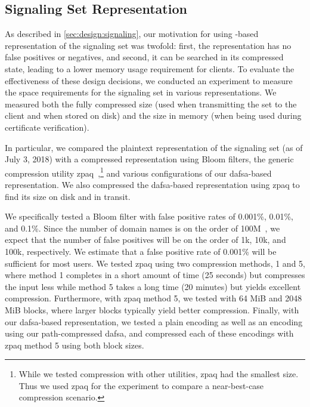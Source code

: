 \subsection{Signaling Set Representation}
\label{sec:evaluation:implementation}

As described in \autoref{sec:design:signaling}, our motivation for using
-based representation of the signaling set was twofold: first, the
representation has no false positives or negatives, and second, it can be
searched in its compressed state, leading to a lower memory usage requirement
for clients. To evaluate the effectiveness of these design decisions, we
conducted an experiment to measure the space requirements for the signaling set
in various representations. We measured both the fully compressed size (used
when transmitting the set to the client and when stored on disk) and the size in
memory (when being used during certificate verification).

In particular, we compared the plaintext representation of the signaling set (as
of July 3, 2018) with a compressed representation using Bloom filters, the
generic compression utility zpaq~\cite{zpaq},\footnote{While we tested
  compression with other utilities, zpaq had the smallest size. Thus we used
zpaq for the experiment to compare a near-best-case compression scenario.} and
various configurations of our \ac{dafsa}-based representation. We also
compressed the \ac{dafsa}-based representation using zpaq to find its size on
disk and in transit. 

We specifically tested a Bloom filter with false positive rates of 0.001\%,
0.01\%, and 0.1\%. Since the number of domain names is on the order of
100M~\cite{dnib-14-1}, we expect that the number of false positives will be on
the order of 1k, 10k, and 100k, respectively. We estimate that a false positive
rate of 0.001\% will be sufficient for most users. We tested zpaq using two
compression methods, 1 and 5, where method 1 completes in a short amount of time
(25 seconds) but compresses the input less while method 5 takes a long time (20
minutes) but yields excellent compression. Furthermore, with zpaq method 5, we
tested with 64 MiB and 2048 MiB blocks, where larger blocks typically yield
better compression. Finally, with our \ac{dafsa}-based representation, we tested
a plain encoding as well as an encoding using our path-compressed \ac{dafsa},
and compressed each of these encodings with zpaq method 5 using both block
sizes.




